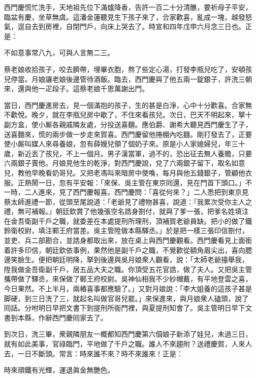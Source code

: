 西門慶慌忙洗手，天地祖先位下滿爐降香，告許一百二十分清醮，要祈母子平安，臨盆有慶，坐草無虞。{}這潘金蓮聽見生下孩子來了，合家歡喜，亂成一塊，越發怒氣，逕自去到房裡，自閉門戶，向床上哭去了。{}時宣和四年戊申六月念三日也。正是：

\begin{myquote}
不如意事常八九，可與人言無二三。
\end{myquote}

蔡老娘收拾孩子，咬去臍帶，埋畢衣胞，熬了些定心湯，打發李瓶兒吃了，安頓孩兒停當。月娘讓老娘後邊管待酒飯。臨去，西門慶與了他五兩一錠銀子，許洗三朝來，還與他一疋段子。這蔡老娘千恩萬謝出門。

當日，西門慶進房去，見一個滿抱的孩子，生的甚是白淨，心中十分歡喜。合家無不歡悅。晚夕，就在李瓶兒房中歇了，不住來看孩兒。次日，巴天不明起來，拏十副方盒，使小厮各親戚隣友處，分投送喜麵。應伯爵、謝希大聽見西門慶生了子，送喜麵來，慌的兩步做一步走來賀喜。西門慶留他捲棚內吃麵。剛打發去了，正要使小厮叫媒人來尋養娘，忽有薛嫂兒領了個奶子來。原是小人家媳婦兒，年三十歲，新近丟了孩兒，不上一個月。男子漢當軍，過不的，恐出征去無人養贍，只要六兩銀子賣他。月娘見他生的乾淨，{}對西門慶說，兌了六兩銀子留下，取名如意兒，教他早晚看奶哥兒。又把老馮叫來暗房中使喚，每月與他五錢銀子，管顧他衣服。正熱鬧一日，忽有平安報：「來保、吳主管在東京囘還，見在門首下頭口。」不一時，二人進來，見了西門慶報喜。西門慶問：「喜從何來？」二人悉把到東京見蔡太師進禮一節，從頭至尾說道：「老爺見了禮物甚喜，說道：『我累次受你主人之禮，無可補報。』朝廷欽賞了他幾張空名誥身劄付，就與了爹一張，把爹名姓填注在金吾衛副千戶之職，就委差在本處提刑所理刑，頂補賀老爺員缺。把小的做了鐵鈴衛校尉，填注鄆王府當差。吳主管陞做本縣驛丞。」於是把一樣三張印信劄付，並吏、兵二部勘合，並誥身都取出來，放在桌上與西門慶觀看。西門慶看見上面銜着許多印信，朝廷欽依事例，果然他是副千戶之職，不覺歡從額角眉尖出，喜向腮邊笑臉生。便把朝廷明降，拏到後邊與吳月娘衆人觀看，說：「太師老爺擡舉我，陞我做金吾衛副千戶，居五品大夫之職。你頂受五花官誥，做了夫人。又把吳主管攜帶做了驛丞，來保做了鄆王府校尉。吳神仙相我不少紗帽戴，有平地登雲之喜，今日果然。不上半月，兩樁喜事都應驗了。」又對月娘說：「李大姐養的這孩子甚是脚硬，到三日洗了三，就起名叫做官哥兒罷。」來保進來，與月娘衆人磕頭，說了囘話。分咐明日早把文書下到提刑所衙門裡，與夏提刑知會了。吳主管明日早下文書到本縣，作辭西門慶囘家去了。

到次日，洗三畢，衆親隣朋友一概都知西門慶第六個娘子新添了娃兒，未過三日，就有如此美事，官祿臨門，平地做了千戶之職。誰人不來趨附？送禮慶賀，人來人去，一日不斷頭。常言：時來誰不來？時不來誰來！正是：

\begin{myquote}
時來頑鐵有光輝，運退眞金無艷色。
\end{myquote}

